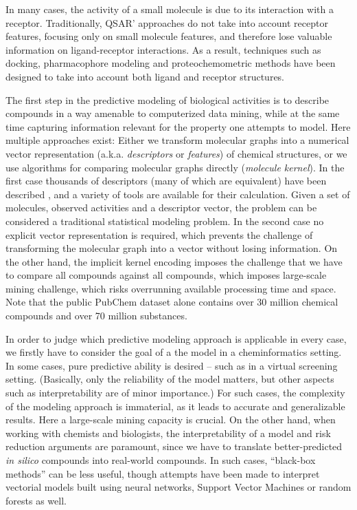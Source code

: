 \documentclass{sig-alternate}
\begin{document}
In many cases, the activity of a small molecule is due to its
interaction with a receptor. Traditionally, QSAR' \cite{Hansch:1962vn,
  Free:1964ys} approaches do not take into account receptor features,
focusing only on small molecule features, and therefore lose valuable
information on ligand-receptor interactions. As a result, techniques
such as docking, pharmacophore modeling and proteochemometric methods
have been designed to take into account both ligand and receptor
structures.

The first step in the predictive modeling of biological activities is
to describe compounds in a way amenable to computerized data mining,
while at the same time capturing information relevant for the property
one attempts to model. Here multiple approaches exist: Either we
transform molecular graphs into a numerical vector representation
(a.k.a. \emph{descriptors} or \emph{features}) of chemical structures,
or we use algorithms for comparing molecular graphs directly
(\emph{molecule kernel}). In the first case thousands of descriptors
(many of which are equivalent) have been described
\cite{todeschini2000}, and a variety of tools are available for their
calculation. Given a set of molecules, observed activities and a
descriptor vector, the problem can be considered a traditional
statistical modeling problem. In the second case no explicit vector
representation is required, which prevents the challenge of
transforming the molecular graph into a vector without losing
information. On the other hand, the implicit kernel encoding imposes
the challenge that we have to compare all compounds against all
compounds, which imposes large-scale mining challenge, which risks
overrunning available processing time and space. Note that the public
PubChem dataset alone contains over 30 million chemical compounds and
over 70 million substances.

In order to judge which predictive modeling approach is applicable in
every case, we firstly have to consider the goal of a the model in a
cheminformatics setting. In some cases, pure predictive ability is
desired -- such as in a virtual screening setting. (Basically, only the
reliability of the model matters, but other aspects such as
interpretability are of minor importance.) For such cases, the
complexity of the modeling approach is immaterial, as it leads to
accurate and generalizable results. Here a large-scale mining capacity
is crucial. On the other hand, when working with chemists and
biologists, the interpretability of a model and risk reduction
arguments are paramount, since we have to translate better-predicted
\emph{in silico} compounds into real-world compounds. In such cases,
``black-box methods'' can be less useful, though attempts have been
made to interpret vectorial models built using neural networks,
Support Vector Machines or random forests as well.
\end{document}
